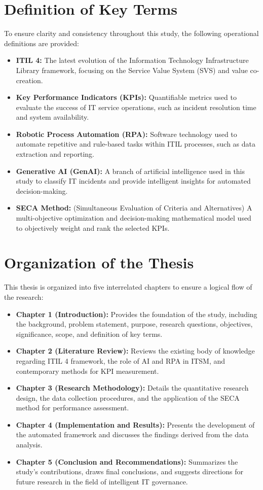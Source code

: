 \documentclass[12pt,a4paper,oneside]{report}
\begin{document}
\section{Definition of Key Terms}
To ensure clarity and consistency throughout this study, the following operational definitions are provided:
\begin{itemize}
    \item \textbf{ITIL 4:} The latest evolution of the Information Technology Infrastructure Library framework, focusing on the Service Value System (SVS) and value co-creation.
    \item \textbf{Key Performance Indicators (KPIs):} Quantifiable metrics used to evaluate the success of IT service operations, such as incident resolution time and system availability.
    \item \textbf{Robotic Process Automation (RPA):} Software technology used to automate repetitive and rule-based tasks within ITIL processes, such as data extraction and reporting.
    \item \textbf{Generative AI (GenAI):} A branch of artificial intelligence used in this study to classify IT incidents and provide intelligent insights for automated decision-making.
    \item \textbf{SECA Method:} (Simultaneous Evaluation of Criteria and Alternatives) A multi-objective optimization and decision-making mathematical model used to objectively weight and rank the selected KPIs.
\end{itemize}

\section{Organization of the Thesis}
This thesis is organized into five interrelated chapters to ensure a logical flow of the research:
\begin{itemize}
    \item \textbf{Chapter 1 (Introduction):} Provides the foundation of the study, including the background, problem statement, purpose, research questions, objectives, significance, scope, and definition of key terms.
    \item \textbf{Chapter 2 (Literature Review):} Reviews the existing body of knowledge regarding ITIL 4 framework, the role of AI and RPA in ITSM, and contemporary methods for KPI measurement.
    \item \textbf{Chapter 3 (Research Methodology):} Details the quantitative research design, the data collection procedures, and the application of the SECA method for performance assessment.
    \item \textbf{Chapter 4 (Implementation and Results):} Presents the development of the automated framework and discusses the findings derived from the data analysis.
    \item \textbf{Chapter 5 (Conclusion and Recommendations):} Summarizes the study’s contributions, draws final conclusions, and suggests directions for future research in the field of intelligent IT governance.
\end{itemize}
\end{document}
